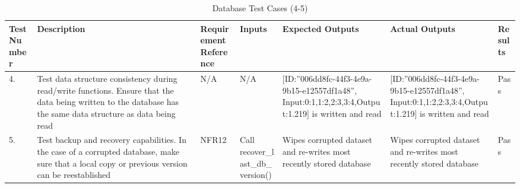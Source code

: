 \documentclass[12pt, titlepage]{article}
\begin{document}
\begin{center}
    \begin{table}[H]
        \centering
        \begin{tabular}{|p{1cm}|p{2.2cm}|p{2.5cm}|p{2.7cm}|p{2.4cm}|p{2.4cm}|p{1.3cm}|}
        \hline
        \bf Test Number & \bf Description & \bf Requirement Reference & \bf Inputs & \bf Expected Outputs & \bf Actual Outputs & \bf Results \\
        \hline
        4. & Test data structure consistency during read/write functions. Ensure that the data being written to the database has the same data structure as data being read & N/A & N/A & [ID:”006dd8fc-44f3-4e9a-9b15-e12557df1a48”, Input:{0:1,1:2,2:3\newline,3:4},\newline Output:1.219\newline222] is written and read & [ID:”006dd8fc-44f3-4e9a-9b15-e12557df1a48”, Input:{0:1,1:2,2:3\newline,3:4},\newline Output:1.219\newline222] is written and read & Pass\\
        \hline
        5. & Test backup and recovery capabilities. In the case of a corrupted database, make sure that a local copy or previous version can be reestablished & NFR12 & Call recover\_last\_\newline db\_version() & Wipes corrupted dataset and re-writes most recently stored database & Wipes corrupted dataset and re-writes most recently stored database & Pass\\
        \hline
        \end{tabular}
        \caption{Database Test Cases (4-5)}
        \label{tab:my_label13}
    \end{table}
\end{center}
\end{document}
